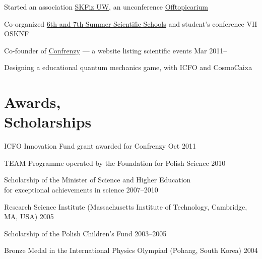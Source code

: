 \documentclass[margin,line]{resume}
\begin{document}
\begin{resume}
    \begin{list2}
    \item Started an association \href{http://skfiz.fuw.edu.pl/en}{SKFiz UW}, an unconference \href{http://offtopicarium.wikidot.com/en:start}{Offtopicarium}

    \item Co-organized \href{http://warsztatywww.wikidot.com/en}{6th and 7th  Summer Scientific Schools} and student's conference VII OSKNF

    \item Co-founder of \href{http://confrenzy.com}{Confrenzy} --- a website listing scientific events \hfill Mar 2011--

    \item Designing a educational quantum mechanics game, with ICFO and CosmoCaixa
    \end{list2}

\vspace{3mm}

    \section{\mysidestyle Awards,\\Scholarships}
    \begin{list2}
    	\item ICFO Innovation Fund grant awarded for Confrenzy \hfill Oct 2011
        \item TEAM Programme operated by the Foundation for Polish Science \hfill 2010
        \item Scholarship of the Minister of Science and Higher Education\\for exceptional achievements in science \hfill 2007--2010
        \item Research Science Institute (Massachusetts Institute of Technology, Cambridge, MA, USA) \hfill 2005
        \item Scholarship of the Polish Children's Fund \hfill 2003--2005
        \item Bronze Medal in the International Physics Olympiad (Pohang, South Korea) \hfill 2004
    \end{list2}


\end{resume}
\end{document}
